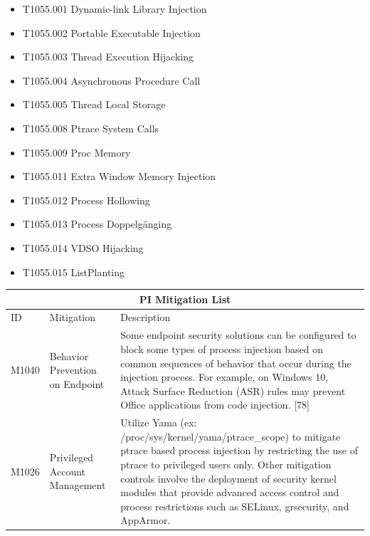 \documentclass{article}
\begin{document}

\textcite{Oosthoek:2019}


\begin{itemize}
\item T1055.001	Dynamic-link Library Injection
\item T1055.002	Portable Executable Injection
\item T1055.003	Thread Execution Hijacking
\item T1055.004	Asynchronous Procedure Call
\item T1055.005	Thread Local Storage
\item T1055.008	Ptrace System Calls
\item T1055.009	Proc Memory
\item T1055.011	Extra Window Memory Injection
\item T1055.012	Process Hollowing
\item T1055.013	Process Doppelgänging
\item T1055.014	VDSO Hijacking
\item T1055.015	ListPlanting
\end{itemize}


\begin{table}[h!]
\centering
\begin{tabular}{ |p{1.2cm}||p{2cm}|p{11.5cm}|  }
  \hline
  \multicolumn{3}{|c|}{PI Mitigation List} \\
  \hline
  ID	& Mitigation & Description \\
  \hline
  M1040	& Behavior Prevention on Endpoint &	Some endpoint security solutions can be configured to block some types of
                                            process injection based on common sequences of behavior that occur during the
                                            injection process. For example, on Windows 10, Attack Surface Reduction (ASR)
                                            rules may prevent Office applications from code injection. [78] \\
  \hline
  M1026 & Privileged Account Management	& Utilize Yama (ex: /proc/sys/kernel/yama/ptrace\_scope) to mitigate ptrace based
                                          process injection by restricting the use of ptrace to privileged users only. Other
                                          mitigation controls involve the deployment of security kernel modules that provide
                                          advanced access control and process restrictions such as SELinux, grsecurity,
                                          and AppArmor. \\
  \hline
\end{tabular}
\label{table: Mitigations}
\end{table}
\end{document}
